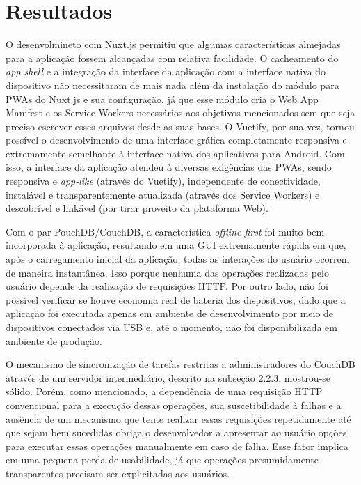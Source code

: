 \documentclass[
	article,			%
	11pt,				%
	oneside,			%
	a4paper,			%
	english,			%
	brazil,				%
	sumario=tradicional
	]{abntex2}
\begin{document}
% 

\section{Resultados}

O desenvolmineto com Nuxt.js permitiu que algumas características almejadas para a aplicação fossem alcançadas com relativa facilidade. O cacheamento do \textit{app shell} e a integração da interface da aplicação com a interface nativa do dispositivo não necessitaram de mais nada além da instalação do módulo para PWAs do Nuxt.js e sua configuração, já que esse módulo cria o Web App Manifest e os Service Workers necessários aos objetivos mencionados sem que seja preciso escrever esses arquivos desde as suas bases. O Vuetify, por sua vez, tornou possível o desenvolvimento de uma interface gráfica completamente responsiva e extremamente semelhante à interface nativa dos aplicativos para Android. Com isso, a interface da aplicação atendeu à diversas exigências das PWAs, sendo responsiva e \textit{app-like} (através do Vuetify), independente de conectividade, instalável e transparentemente atualizada (através dos Service Workers) e descobrível e linkável (por tirar proveito da plataforma Web).

Com o par PouchDB/CouchDB, a característica \textit{offline-first} foi muito bem incorporada à aplicação, resultando em uma GUI extremamente rápida em que, após o carregamento inicial da aplicação, todas as interações do usuário ocorrem de maneira instantânea. Isso porque nenhuma das operações realizadas pelo usuário depende da realização de requisições HTTP. Por outro lado, não foi possível verificar se houve economia real de bateria dos dispositivos, dado que a aplicação foi executada apenas em ambiente de desenvolvimento por meio de dispositivos conectados via USB e, até o momento, não foi disponibilizada em ambiente de produção.

O mecanismo de sincronização de tarefas restritas a administradores do CouchDB através de um servidor intermediário, descrito na subseção 2.2.3, mostrou-se sólido. Porém, como mencionado, a dependência de uma requisição HTTP convencional para a execução dessas operações, sua suscetibilidade à falhas e a ausência de um mecanismo que tente realizar essas requisições repetidamente até que sejam bem sucedidas obriga o desenvolvedor a apresentar ao usuário opções para executar essas operações manualmente em caso de falha. Esse fator implica em uma pequena perda de usabilidade, já que operações presumidamente transparentes precisam ser explicitadas aos usuários.
\end{document}
